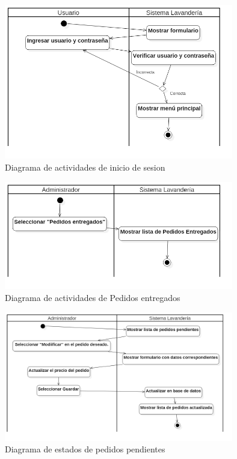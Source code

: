 \begin{figure}[htb]
\begin{center}
\includegraphics[width=10cm]{./imagenes/diagramas/Actividades_Lavanderia_InicioSesion.png}
\end{center}
\caption{Diagrama de actividades de inicio de sesion}
\end{figure}

\begin{figure}[htb]
\begin{center}
\includegraphics[width=10cm]{./imagenes/diagramas/Actividades_Lavanderia_PedidosEntregados.png}
\end{center}
\caption{Diagrama de actividades de Pedidos entregados}
\end{figure}

\begin{figure}[htb]
\begin{center}
\includegraphics[width=10cm]{./imagenes/diagramas/Actividades_Lavanderia_PedidosPendientes.png}
\end{center}
\caption{Diagrama de estados de pedidos pendientes}
\end{figure}

